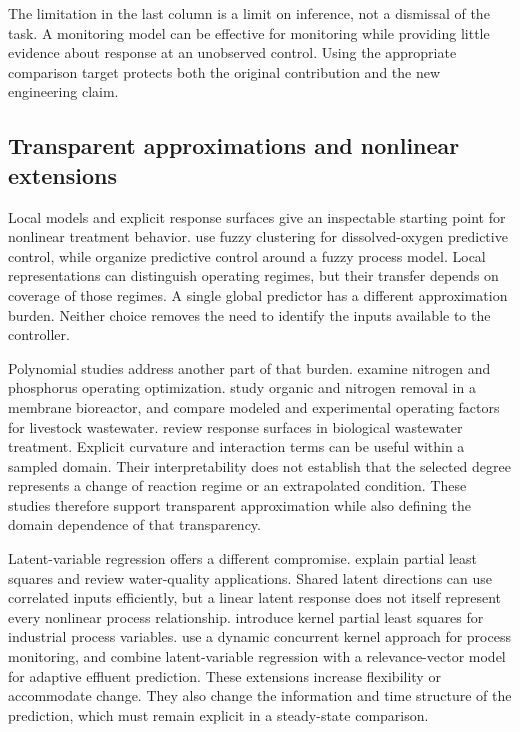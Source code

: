 The limitation in the last column is a limit on inference, not a dismissal of the task. A monitoring model can be effective for monitoring while providing little evidence about response at an unobserved control. Using the appropriate comparison target protects both the original contribution and the new engineering claim.

\subsection{Transparent approximations and nonlinear extensions}

Local models and explicit response surfaces give an inspectable starting point for nonlinear treatment behavior. \citet{Li2020} use fuzzy clustering for dissolved-oxygen predictive control, while \citet{Yang2014} organize predictive control around a fuzzy process model. Local representations can distinguish operating regimes, but their transfer depends on coverage of those regimes. A single global predictor has a different approximation burden. Neither choice removes the need to identify the inputs available to the controller.

Polynomial studies address another part of that burden. \citet{Kim2009} examine nitrogen and phosphorus operating optimization. \citet{Lim2011} study organic and nitrogen removal in a membrane bioreactor, and \citet{Ahn2014} compare modeled and experimental operating factors for livestock wastewater. \citet{Nazlabadi2021} review response surfaces in biological wastewater treatment. Explicit curvature and interaction terms can be useful within a sampled domain. Their interpretability does not establish that the selected degree represents a change of reaction regime or an extrapolated condition. These studies therefore support transparent approximation while also defining the domain dependence of that transparency.

Latent-variable regression offers a different compromise. \citet{Wold2001} explain partial least squares and \citet{Khatri2020} review water-quality applications. Shared latent directions can use correlated inputs efficiently, but a linear latent response does not itself represent every nonlinear process relationship. \citet{Woo2009} introduce kernel partial least squares for industrial process variables. \citet{Liu2021} use a dynamic concurrent kernel approach for process monitoring, and \citet{Yang2021} combine latent-variable regression with a relevance-vector model for adaptive effluent prediction. These extensions increase flexibility or accommodate change. They also change the information and time structure of the prediction, which must remain explicit in a steady-state comparison.

